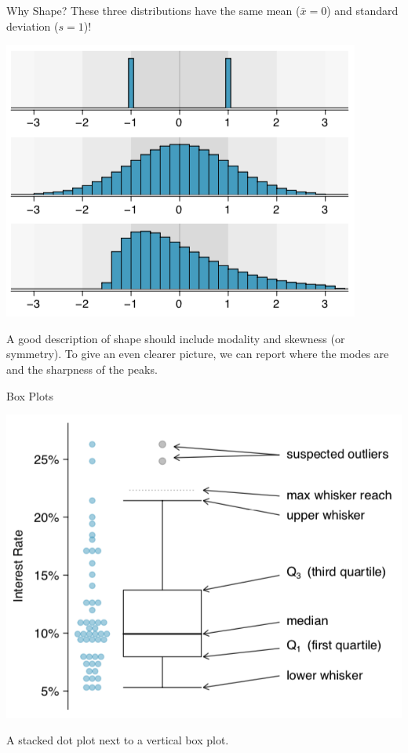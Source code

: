 \begin{frame}{Why Shape?}
    These three distributions have the same mean ($\bar{x}=0$) and standard deviation ($s=1$)!
    \begin{center}
        \includegraphics[scale=0.35]{images/shapes.png}
    \end{center}
    A good description of shape should include modality and skewness (or symmetry). To give an even clearer picture, we can report where the modes are and the sharpness of the peaks.
\end{frame}

\begin{frame}{Box Plots}
    \begin{center}
        \includegraphics[scale=0.4]{images/boxplot.png}
    \end{center}
    A stacked dot plot next to a vertical box plot. 
\end{frame}

